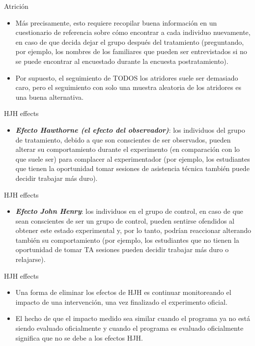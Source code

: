 \documentclass[11pt, aspectratio=169, compress]{beamer}
\begin{document}
\begin{frame}{Atrición}
	\begin{itemize}
		\item Más precisamente, esto requiere recopilar buena información en un cuestionario de referencia sobre cómo encontrar a cada individuo nuevamente, en caso de que decida dejar el grupo después del tratamiento (preguntando, por ejemplo, los nombres de los familiares que pueden ser entrevistados si no se puede encontrar al encuestado durante la encuesta postratamiento).
		\item Por supuesto, el seguimiento de TODOS los atridores suele ser demasiado caro, pero el seguimiento con solo una muestra aleatoria de los atridores es una buena alternativa.
	\end{itemize}
\end{frame}
\begin{frame}{HJH effects}
	\begin{itemize}
		\item \textit{\textbf{Efecto Hawthorne (el efecto del observador)}}: los individuos del grupo de tratamiento, debido a que son conscientes de ser observados, pueden alterar su comportamiento durante el experimento (en comparación con lo que suele ser) para complacer al experimentador (por ejemplo, los estudiantes que tienen la oportunidad tomar sesiones de asistencia técnica también puede decidir trabajar más duro).
	\end{itemize}
\end{frame}
\begin{frame}{HJH effects}
	\begin{itemize}
		\item \textit{\textbf{Efecto John Henry}}: los individuos en el grupo de control, en caso de que sean conscientes de ser un grupo de control, pueden sentirse ofendidos al obtener este estado experimental y, por lo tanto, podrían reaccionar alterando también su comportamiento (por ejemplo, los estudiantes que no tienen la oportunidad de tomar TA sesiones pueden decidir trabajar más duro o relajarse).
	\end{itemize}
\end{frame}
\begin{frame}{HJH effects}
	\begin{itemize}
		\item Una forma de eliminar los efectos de HJH es continuar monitoreando el impacto de una intervención, una vez finalizado el experimento oficial.
		
		\item El hecho de que el impacto medido sea similar cuando el programa ya no está siendo evaluado oficialmente y cuando el programa es evaluado oficialmente significa que no se debe a los efectos HJH.
	\end{itemize}
\end{frame}
\end{document}
